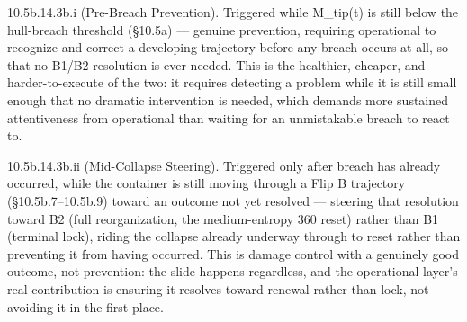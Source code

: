 \documentclass[
]{article}
\begin{document}
10.5b.14.3b.i (Pre-Breach Prevention). Triggered while M\_tip(t) is
still below the hull-breach threshold (§10.5a) --- genuine prevention,
requiring operational to recognize and correct a developing trajectory
before any breach occurs at all, so that no B1/B2 resolution is ever
needed. This is the healthier, cheaper, and harder-to-execute of the
two: it requires detecting a problem while it is still small enough that
no dramatic intervention is needed, which demands more sustained
attentiveness from operational than waiting for an unmistakable breach
to react to.

10.5b.14.3b.ii (Mid-Collapse Steering). Triggered only after breach has
already occurred, while the container is still moving through a Flip B
trajectory (§10.5b.7--10.5b.9) toward an outcome not yet resolved ---
steering that resolution toward B2 (full reorganization, the
medium-entropy 360 reset) rather than B1 (terminal lock), riding the
collapse already underway through to reset rather than preventing it
from having occurred. This is damage control with a genuinely good
outcome, not prevention: the slide happens regardless, and the
operational layer's real contribution is ensuring it resolves toward
renewal rather than lock, not avoiding it in the first place.
\end{document}
